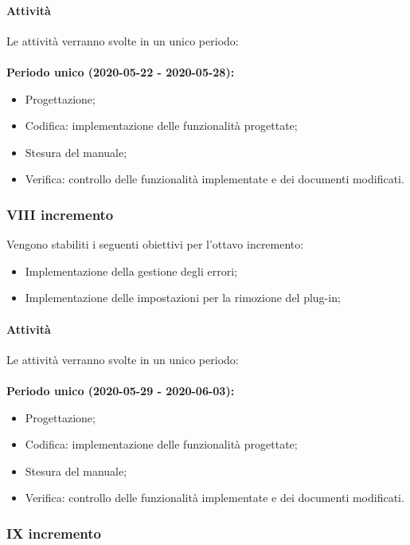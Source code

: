 \documentclass[../piano-di-progetto.tex]{subfiles}
\begin{document}
\paragraph{Attività}
Le attività verranno svolte in un unico periodo:
\\
\\
\textbf{Periodo unico (2020-05-22 - 2020-05-28):}
\begin{itemize}
    \item Progettazione;
    \item Codifica: implementazione delle funzionalità progettate;
    \item Stesura del manuale;
    \item Verifica: controllo delle funzionalità implementate e dei documenti modificati.
\end{itemize}


\subsubsection{VIII incremento}

 Vengono stabiliti i seguenti obiettivi per l'ottavo incremento:
 \begin{itemize}
    \item Implementazione della gestione degli errori;
    \item Implementazione delle impostazioni per la rimozione del plug-in;

 \end{itemize}
\paragraph{Attività}
Le attività verranno svolte in un unico periodo:
\\
\\
\textbf{Periodo unico (2020-05-29 - 2020-06-03):}
\begin{itemize}
    \item Progettazione;
    \item Codifica: implementazione delle funzionalità progettate;
    \item Stesura del manuale;
    \item Verifica: controllo delle funzionalità implementate e dei documenti modificati.
\end{itemize}


\subsubsection{IX incremento}
\end{document}
